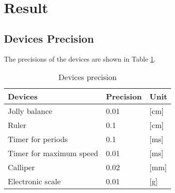 \section{Result}

\subsection{Devices Precision}
The precisions of the devices are shown in Table \ref{pre}.
\begin{table}[H]
\centering
\begin{tabular}{|l|p{2cm}|p{1cm}|}
\hline
Devices & Precision & Unit \\ \hline
Jolly balance & 0.01 & [cm] \\ \hline
Ruler & 0.1 & [cm] \\ \hline
Timer for periods & 0.1 & [ms] \\ \hline
Timer for maximum speed & 0.01 & [ms] \\ \hline
Calliper & 0.02 & [mm] \\ \hline
Electronic scale & 0.01 & [g] \\ \hline
\end{tabular}
\caption{Devices precision}\label{pre}
\end{table}